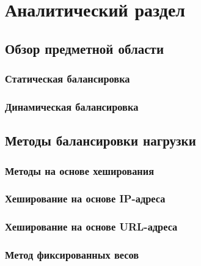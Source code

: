 \section{Аналитический раздел}

\subsection{Обзор предметной области}

\subsubsection*{Статическая балансировка}

\subsubsection*{Динамическая балансировка}

\subsection{Методы балансировки нагрузки}


\subsubsection{Методы на основе хеширования}

\subsubsection*{Хеширование на основе IP-адреса}

\subsubsection*{Хеширование на основе URL-адреса}

\subsubsection{Метод фиксированных весов}
